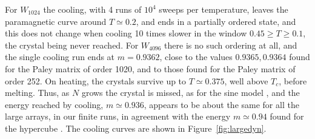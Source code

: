 \documentclass[11pt,a4paper]{article}
\theoremstyle{remark}
\begin{document}
For $W_{1024}$ the cooling, with 4 runs of $10^4$ sweeps per temperature, leaves the paramagnetic curve around $T\simeq0.2$, and ends in a partially ordered state, and this does not change when cooling 10 times slower in the window $0.45\geq T\geq0.1$, the crystal being never reached. For $W_{4096}$ there is no such ordering at all, and the single cooling run ends at $m=0.9362$, close to the values $0.9365,0.9364$ found for the Paley matrix of order 1020, and to those found for the Paley matrix of order 252. On heating, the crystals survive up to $T\simeq0.375$, well above $T_c$, before melting. Thus, as $N$ grows the crystal is missed, as for the sine model \cite{mp2}, and the energy reached by cooling, $m\simeq0.936$, appears to be about the same for all the large arrays, in our finite runs, in agreement with the energy $m\simeq0.94$ found for the hypercube \cite{mp3}. The cooling curves are shown in Figure~\ref{fig:largedyn}.
\end{document}
